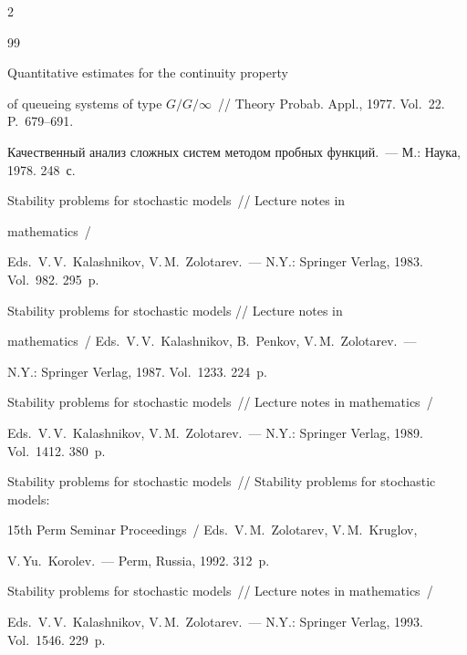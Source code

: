\begin{multicols}{2}
{{\begin{thebibliography}{99}

 Quantitative estimates for the continuity property

of queueing systems of type $G/G/\infty$~// Theory Probab. Appl., 1977. Vol.~22. P.~679--691.





Качественный анализ сложных сис\-тем методом пробных функций.~--- М.: Наука, 1978. 248~с.






Stability problems for stochastic models~// Lecture notes in

mathematics~/

Eds.\ V.\,V.~Kalashnikov, V.\,M.~Zolotarev.~--- N.Y.: Springer Verlag, 1983. Vol.~982. 295~p.




Stability problems for stochastic models // Lecture notes in

mathematics~/ Eds.\ V.\,V.~Kalashnikov, B.~Penkov, V.\,M.~Zolotarev.~--- 

N.Y.: Springer Verlag, 1987. Vol.~1233. 224~p.




Stability problems for stochastic models~// Lecture notes in mathematics~/

Eds.\ V.\,V.~Kalashnikov, V.\,M.~Zolotarev.~--- N.Y.: Springer Verlag, 1989. Vol.~1412. 380~p.




Stability problems for stochastic models~// Stability problems for stochastic models:

15th Perm Seminar Proceedings~/ Eds.\ V.\,M.~Zolotarev, V.\,M.~Kruglov,

V.\,Yu.~Korolev.~--- Perm, Russia, 1992. 312~p.




Stability problems for stochastic models~// Lecture notes in mathematics~/

Eds.\ V.\,V.~Kalashnikov, V.\,M.~Zolotarev.~--- N.Y.: Springer Verlag, 1993. Vol.~1546. 229~p.








\end{thebibliography}}}
\end{multicols}
